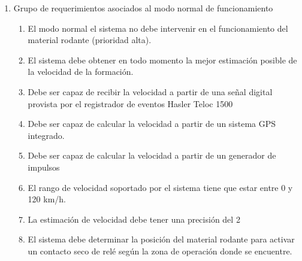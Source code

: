 \begin{enumerate}
    \item Grupo de requerimientos asociados al modo normal de funcionamiento
    \begin{enumerate}
        \item El modo normal el sistema no debe intervenir en el funcionamiento del material rodante (prioridad alta).
        \item El sistema debe obtener en todo momento la mejor estimación posible de la velocidad de la formación.
        \item Debe ser capaz de recibir la velocidad a partir de una señal digital provista por el registrador de eventos Hasler Teloc 1500
        \item Debe ser capaz de calcular la velocidad a partir de un sistema GPS integrado.
        \item Debe ser capaz de calcular la velocidad a partir de un generador de impulsos
        \item El rango de velocidad soportado por el sistema tiene que estar entre 0 y 120 km/h.
        \item La estimación de velocidad debe tener una precisión del 2 %
        \item El sistema debe determinar la posición del material rodante para activar un contacto seco de relé según la zona de operación donde se encuentre.
    \end{enumerate}
       

\end{enumerate}
